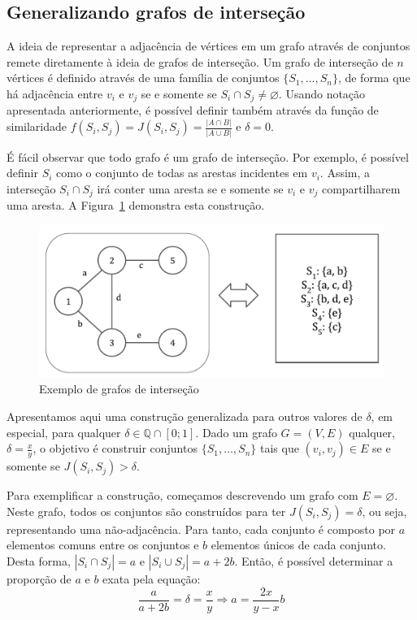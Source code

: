 \subsection{Generalizando grafos de interseção}

A ideia de representar a adjacência de vértices em um grafo através de conjuntos remete diretamente à ideia de grafos de interseção. Um grafo de interseção de $n$ vértices é definido através de uma família de conjuntos $\{S_1, \ldots, S_n\}$, de forma que há adjacência entre $v_i$ e $v_j$ se e somente se $S_i \cap S_j \neq \varnothing$. Usando notação apresentada anteriormente, é possível definir também através da função de similaridade $f(S_i, S_j) = J(S_i, S_j) = \frac{|A \cap B|}{|A \cup B|}$ e $\delta = 0$.

É fácil observar que todo grafo é um grafo de interseção. Por exemplo, é possível definir $S_i$ como o conjunto de todas as arestas incidentes em $v_i$. Assim, a interseção $S_i \cap S_j$ irá conter uma aresta se e somente se $v_i$ e $v_j$ compartilharem uma aresta. A Figura~\ref{fig:graph_intersection} demonstra esta construção.

\begin{figure}[!htbp]
  \centering
  \includegraphics[scale=0.6]{figures/graphs_intersection.pdf}
  \caption{Exemplo de grafos de interseção}
  \label{fig:graph_intersection}
\end{figure}

Apresentamos aqui uma construção generalizada para outros valores de $\delta$, em especial, para qualquer $\delta \in \mathbb{Q} \cap [0;1]$. Dado um grafo $G = (V, E)$ qualquer, $\delta = \frac{x}{y}$, o objetivo é construir conjuntos $\{S_1, \ldots, S_n\}$ tais que $(v_i, v_j) \in E$ se e somente se $J(S_i, S_j) > \delta$.

Para exemplificar a construção, começamos descrevendo um grafo com $E = \varnothing$. Neste grafo, todos os conjuntos são construídos para ter $J(S_i, S_j) = \delta$, ou seja, representando uma não-adjacência. Para tanto, cada conjunto é composto por $a$ elementos comuns entre os conjuntos e $b$ elementos únicos de cada conjunto. Desta forma, $|S_i \cap S_j| = a$ e $|S_i \cup S_j| = a + 2b$. Então, é possível determinar a proporção de $a$ e $b$ exata pela equação:
\[
    \frac{a}{a+2b} = \delta = \frac{x}{y} \Rightarrow a = \frac{2x}{y-x}b
\]

